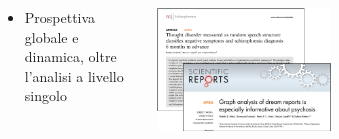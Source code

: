 \begin{minipage}[t]{\textwidth}
    \begin{columns}
        \begin{column}{0.5\textwidth}
        \begin{itemize}
        \item Prospettiva globale e dinamica, oltre l'analisi a livello singolo
        \end{itemize}
        \end{column}
    \begin{column}{0.5\textwidth}
        \centering
        \includegraphics[width=0.5\textwidth]{immagini/paper_2}
        \vspace{0.2cm}
    \end{column}
\end{columns}
\end{minipage}
